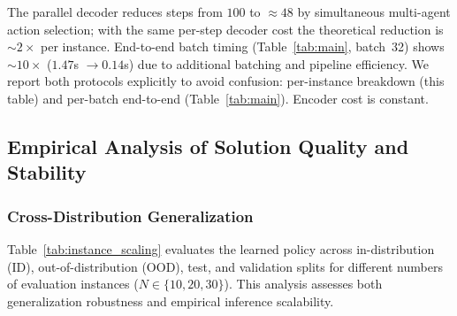 \documentclass[journal,twoside,web]{ieeecolor}
\theoremstyle{definition}
\theoremstyle{remark}
\theoremstyle{definition}
\begin{document}
The parallel decoder reduces steps from $100$ to $\approx 48$ by simultaneous multi-agent action selection; with the same per-step decoder cost the theoretical reduction is $\sim 2\times$ per instance. End-to-end batch timing (Table~\ref{tab:main}, batch~32) shows $\sim 10\times$ ($1.47$s $\to 0.14$s) due to additional batching and pipeline efficiency. We report both protocols explicitly to avoid confusion: per-instance breakdown (this table) and per-batch end-to-end (Table~\ref{tab:main}). Encoder cost is constant.

\subsection{Empirical Analysis of Solution Quality and Stability}
\subsubsection{Cross-Distribution Generalization}
Table~\ref{tab:instance_scaling} evaluates the learned policy across in-distribution (ID), out-of-distribution (OOD), test, and validation splits for different numbers of evaluation instances ($N \in \{10,20,30\}$). This analysis assesses both generalization robustness and empirical inference scalability.
\end{document}
